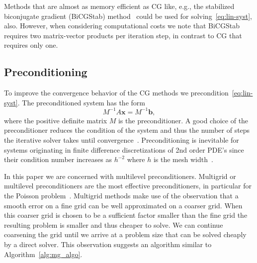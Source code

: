 \documentclass[a4paper,10pt,3p,final,pdftex]{elsarticle}
\begin{document}
Methods that are almost as memory efficient as CG like, e.g., the
stabilized biconjugate gradient (BiCGStab) method~\cite{vors:92} could
be used for solving~\eqref{eq:lin-syst}, also.  However, when
considering computational costs we note that BiCGStab requires two
matrix-vector products per iteration step, in contrast to CG that
requires only one.

\subsection{Preconditioning}

To improve the convergence behavior of the CG methods we
precondition~\eqref{eq:lin-syst}.  The preconditioned system has the
form
\begin{equation*}
  {M}^{-1}{A} \mathbf{x} = {M}^{-1}\mathbf{b},
\end{equation*}
where the positive definite matrix $M$ is the preconditioner.
A good choice of the preconditioner reduces the condition of the system
and thus the number of steps the iterative solver takes until
convergence~\cite{hack:94,gree:97}.  Preconditioning is inevitable for systems
originating in finite difference discretizations of 2nd order PDE's since
their condition number increases as $h^{-2}$ where $h$ is the mesh width~\cite{leve:07}.

In this paper we are concerned with multilevel preconditioners.
Multigrid or multilevel preconditioners are the most effective
preconditioners, in particular for the Poisson
problem~\cite{hack:85,tros:00}.  Multigrid methods make use of the
observation that a smooth error on a fine grid can be well approximated
on a coarser grid.  When this coarser grid is chosen to be a sufficient
factor smaller than the fine grid the resulting problem is smaller and
thus cheaper to solve.  We can continue coarsening the grid until we
arrive at a problem size that can be solved cheaply by a direct solver.
This observation suggests an algorithm similar to
Algorithm~\ref{alg:mg_algo}.
\end{document}
